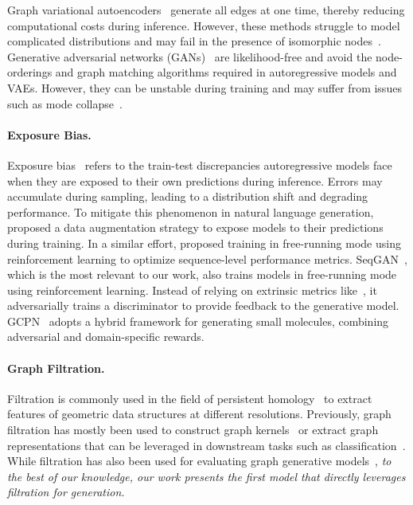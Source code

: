 Graph variational autoencoders~\citep{kipf2016graphvae,simonovsky2018graphvae} generate all edges at one time, thereby reducing computational costs during inference. However, these methods struggle to model complicated distributions and may fail in the presence of isomorphic nodes~\citep{zhang2021labeling}.
Generative adversarial networks (GANs)~\citep{bojchevski2018netgan,cao2018molgan,martinkus2022spectre} are likelihood-free and avoid the node-orderings and graph matching algorithms required in autoregressive models and VAEs. However, they can be unstable during training and may suffer from issues such as mode collapse~\citep{martinkus2022spectre}.

\paragraph{Exposure Bias.} Exposure bias~\citep{bengio2015exposure_bias,ranzato2016sequencelevel} refers to the train-test discrepancies autoregressive models face when they are exposed to their own predictions during inference. Errors may accumulate during sampling, leading to a distribution shift and degrading performance. To mitigate this phenomenon in natural language generation, \citet{bengio2015exposure_bias} proposed a data augmentation strategy to expose models to their predictions during training. In a similar effort, \citet{ranzato2016sequencelevel} proposed training in free-running mode using reinforcement learning to optimize sequence-level performance metrics. SeqGAN~\citep{yu2017seqgan}, which is the most relevant to our work, also trains models in free-running mode using reinforcement learning. Instead of relying on extrinsic metrics like~\citet{ranzato2016sequencelevel}, it adversarially trains a discriminator to provide feedback to the generative model. GCPN~\citep{you2018gcpn} adopts a hybrid framework for generating small molecules, combining adversarial and domain-specific rewards.

\paragraph{Graph Filtration.} %
Filtration is commonly used in the field of persistent homology~\citep{edelsbrunner2002filtration} to extract features of geometric data structures at different resolutions. Previously, graph filtration has mostly been used to construct graph kernels~\citep{zhao2019persistenceclassification,schulz2022filtrationkernel} or extract graph representations that can be leveraged in downstream tasks such as classification~\citep{obray2021filtrationcurves}. While filtration has also been used for evaluating graph generative models~\citep{southern2023ggevaluation}, \emph{to the best of our knowledge, our work presents the first model that directly leverages filtration for generation.}